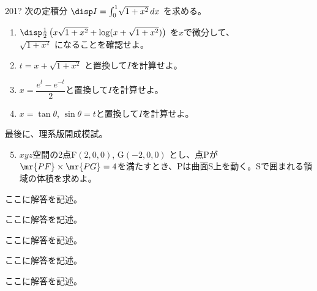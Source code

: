 \begin{thm}{201}{\hosi ?}{}
 次の定積分 $\disp I=\int_0^1\! \sqrt{1+x^2} \,dx$ を求める。
 \begin{enumerate}
  \item $\disp \frac{1}{2}\left(x\sqrt{1+x^2}+\log (x+\sqrt{1+x^2})\right)$ を$x$で微分して、\\ $\sqrt{1+x^2}$ になることを確認せよ。
  \item $t=x+\sqrt{1+x^2}$ と置換して$I$を計算せよ。
  \item $x=\dfrac{e^t-e^{-t}}{2}$と置換して$I$を計算せよ。
  \item $x=\tan\theta$, $\sin\theta=t$と置換して$I$を計算せよ。
 \end{enumerate}

 最後に、理系版開成模試。
 \begin{enumerate}
  \setcounter{enumi}{4}
  \item $xyz$空間の2点F$(2,0,0)$, G$(-2,0,0)$ とし、点Pが$\mr{PF}\times\mr{PG}=4$を満たすとき、Pは曲面S上を動く。Sで囲まれる領域の体積を求めよ。
 \end{enumerate}
\end{thm}

ここに解答を記述。

ここに解答を記述。

ここに解答を記述。

ここに解答を記述。

ここに解答を記述。